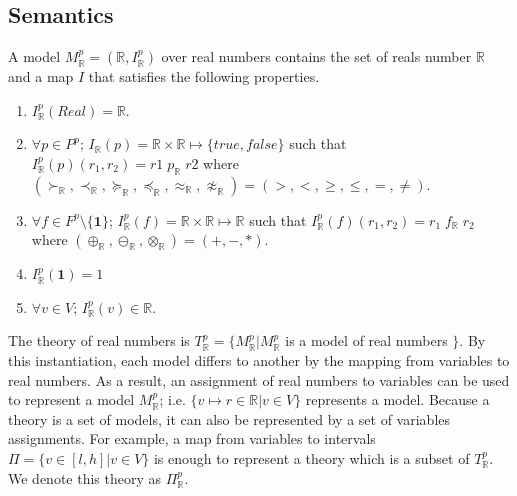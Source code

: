 \subsection{Semantics}
A model $M^p_{\mathbb{R}} = (\mathbb{R}, I^p_{\mathbb{R}})$ over real numbers contains the set of reals number $\mathbb{R}$ and a map $I$ that satisfies the following properties.
\begin{enumerate}
\item $I^p_{\mathbb{R}}(Real) = \mathbb{R}$.
\item $\forall p \in P^p$; $I_{\mathbb{R}}(p) = \mathbb{R} \times \mathbb{R} \mapsto \{true, false\}$ such that $ I_\mathbb{R}^p(p)(r_1, r_2) = r1 \; p_{\mathbb{R}} \; r2$ where $(\succ_\mathbb{R}, \prec_{\mathbb{R}},\succeq_\mathbb{R},\preceq_{\mathbb{R}}, \approx_\mathbb{R}, \not\approx_\mathbb{R}) = (>, <, \ge, \le, =, \neq)$.
\item $\forall f \in F^p \setminus \{\mathbf{1}\}$; $I^p_{\mathbb{R}}(f) = \mathbb{R} \times \mathbb{R} \mapsto \mathbb{R}$ such that $I^p_{\mathbb{R}}(f)(r_1, r_2)  = r_1 \; f_{\mathbb{R}} \; r_2$ where $(\oplus_{\mathbb{R}}, \ominus_{\mathbb{R}}, \otimes_{\mathbb{R}}) = (+, -, *)$.
\item $I^p_\mathbb{R}(\mathbf{1}) = 1$
\item $\forall v \in V$; $I^p_{\mathbb{R}}(v) \in \mathbb{R}$.
\end{enumerate}
The theory of real numbers is $T^p_{\mathbb{R}} = \{M^p_{\mathbb{R}} | M^p_{\mathbb{R}}$ is a model of real numbers $\}$.
By this instantiation, each model differs to another by the mapping from variables to real numbers. As a result, an assignment of real numbers to variables can be used to represent a model $M^p_{\mathbb{R}}$; i.e. $\{v \mapsto r \in \mathbb{R} | v \in V\}$ represents a model. Because a theory is a set of models, it can also be represented by a set of variables assignments. For example, a map from variables to intervals $\Pi = \{v \in [l, h] | v \in V\}$ is enough to represent a theory which is a subset of $T^p_\mathbb{R}$. We denote this theory as $\Pi^p_\mathbb{R}$.

